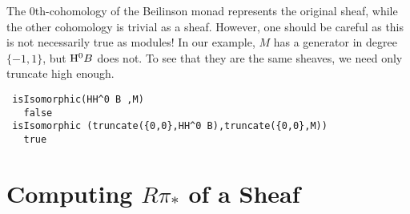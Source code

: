 \documentclass[twoside,12pt, leqno]{amsart}
\begin{document}
The 0th-cohomology of the Beilinson monad represents the original sheaf,
while the other cohomology is trivial as a sheaf. However, one should be careful as this is not necessarily true as modules! In our example, $M$ has a generator in degree $\{-1,1\}$, but ${\rm H}^0 B$ does not.
To see that they are the same sheaves, we need only truncate high enough.
{\small
\begin{verbatim}
 isIsomorphic(HH^0 B ,M)
   false
 isIsomorphic (truncate({0,0},HH^0 B),truncate({0,0},M))
   true
\end{verbatim}}


\section{Computing $R\pi_*$ of a Sheaf}\label{sec:push forward}
\end{document}
